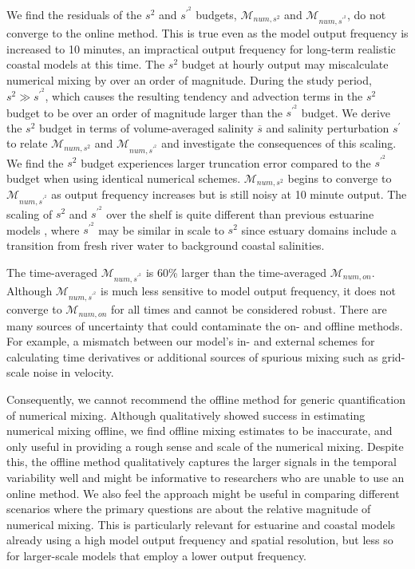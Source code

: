 We find the residuals of the $s^2$ and $s^{\prime^2}$ budgets, $\mathcal{M}_{num, s^2}$ and $\mathcal{M}_{num, s^{\prime^2}}$, do not converge to the online method. This is true even as the model output frequency is increased to 10 minutes, an impractical output frequency for long-term realistic coastal models at this time. The $s^2$ budget at hourly output may miscalculate numerical mixing by over an order of magnitude. During the study period, $s^2\gg s^{\prime^2}$, which causes the resulting tendency and advection terms in the $s^2$ budget to be over an order of magnitude larger than the $s^{\prime^2}$ budget. We derive the $s^2$ budget in terms of volume-averaged salinity $\overline{s}$ and salinity perturbation $s^\prime$ to relate $\mathcal{M}_{num, s^2}$ and $\mathcal{M}_{num, s^{\prime^2}}$ and investigate the consequences of this scaling. We find the $s^2$ budget experiences larger truncation error compared to the $s^{\prime^2}$ budget when using identical numerical schemes. $\mathcal{M}_{num, s^2}$ begins to converge to $\mathcal{M}_{num, s^{\prime^2}}$ as output frequency increases but is still noisy at 10 minute output. The scaling of $s^2$ and $s^{\prime^2}$ over the shelf is quite different than previous estuarine models \citep{Li_2018, Li_2021, Warner_2020}, where $s^{\prime^2}$ may be similar in scale to $s^2$ since estuary domains include a transition from fresh river water to background coastal salinities. 

The time-averaged $\mathcal{M}_{num, s^{\prime^2}}$ is 60\% larger than the time-averaged $\mathcal{M}_{num, on}$. Although $\mathcal{M}_{num, s^{\prime^2}}$ is much less sensitive to model output frequency, it does not converge to $\mathcal{M}_{num, on}$ for all times and cannot be considered robust. There are many sources of uncertainty that could contaminate the on- and offline methods. For example, a mismatch between our model's in- and external schemes for calculating time derivatives or additional sources of spurious mixing such as grid-scale noise in velocity. 

Consequently, we cannot recommend the offline method for generic quantification of numerical mixing. Although \citet{Wang_2021} qualitatively showed success in estimating numerical mixing offline, we find offline mixing estimates to be inaccurate, and only useful in providing a rough sense and scale of the numerical mixing. Despite this, the offline method qualitatively captures the larger signals in the temporal variability well and might be informative to researchers who are unable to use an online method. We also feel the approach might be useful in comparing different scenarios where the primary questions are about the relative magnitude of numerical mixing. This is particularly relevant for estuarine and coastal models already using a high model output frequency and spatial resolution, but less so for larger-scale models that employ a lower output frequency. 

